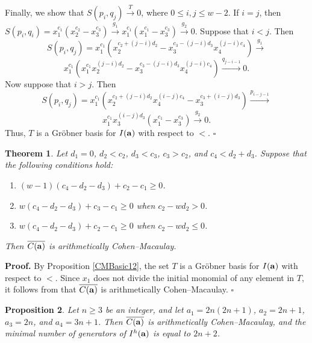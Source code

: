 \documentclass[10pt]{amsart}
\newtheorem{thm1}{Theorem}[section]
\newtheorem{prop1}[thm1]{Proposition}
\begin{document}
Finally, we show that $S(p_{i},q_{j}) \stackrel{T}{\longrightarrow} 0$, where $0 \leq i, j \leq w-2$. If $i=j$, then 
$S(p_i,q_i)=x_1^{c_1}(x_2^{c_2}-x_3^{c_3}) \stackrel{g_1} {\longrightarrow} x_1^{c_1}(x_1^{c_1}-x_3^{c_3}) \stackrel{g_2} {\longrightarrow} 0$. Suppose that $i<j$. Then $$S(p_{i},q_{j})=x_{1}^{c_1}(x_{2}^{c_2+(j-i)d_2}-x_{3}^{c_3-(j-i)d_3}x_{4}^{(j-i)c_4}) \stackrel{g_{1}}{\longrightarrow}$$ $$x_{1}^{c_1}(x_{1}^{c_1}x_{2}^{(j-i)d_2}-x_{3}^{c_3-(j-i)d_3}x_{4}^{(j-i)c_4}) \stackrel{q_{j-i-1}}{\longrightarrow} 0.$$ Now suppose that $i>j$. Then $$S(p_{i},q_{j})=x_{1}^{c_1}(x_{2}^{c_2+(j-i)d_2}x_{4}^{(i-j)c_4}-x_{3}^{c_3+(i-j)d_3}) \stackrel{p_{i-j-1}}{\longrightarrow}$$ $$x_{1}^{c_1}x_{3}^{(i-j)d_3}(x_{1}^{c_1}-x_{3}^{c_3}) \stackrel{g_{2}}{\longrightarrow} 0.$$ Thus, $T$ is a Gr\"obner basis for $I({\bf a})$ with respect to $<$. \hfill $\square$ \par\vspace{0.5\baselineskip}


\begin{thm1} \label{CM16} Let $d_1=0$, $d_{2}<c_{2}$, $d_{3}<c_{3}$, $c_3>c_2$, and $c_4<d_{2}+d_{3}$. Suppose that the following conditions hold:
\begin{enumerate} \item $(w-1)(c_{4}-d_{2}-d_{3})+c_{2}-c_{1} \geq 0$.
\item $w(c_{4}-d_{2}-d_{3})+c_{3}-c_{1} \geq 0$ when $c_{2}-wd_{2}> 0$.
\item $w(c_{4}-d_{2}-d_{3})+c_{2}-c_{1} \geq 0$ when $c_{2}-wd_{2} \leq 0$.

\end{enumerate}
Then $\overline{C({\bf a})}$ is arithmetically Cohen--Macaulay.
\end{thm1}

\noindent \textbf{Proof.} By Proposition \ref{CMBasic12}, the set $T$ is a Gr\"obner basis for $I({\bf a})$ with respect to $<$. Since $x_1$ does not divide the initial monomial of any element in $T$, it follows from \cite[Theorem 2.2]{HerSta} that $\overline{C({\bf a})}$ is arithmetically Cohen--Macaulay. \hfill $\square$


\begin{prop1} \label{ACM7} Let $n \geq 3$ be an integer, and let
$a_1=2n(2n+1)$, $a_2=2n+1$, $a_3=2n$, and $a_4=3n+1$. Then
$\overline{C({\bf a})}$ is arithmetically Cohen--Macaulay, and the minimal
number of generators of $I^{h}({\bf a})$ is equal to $2n+2$.
\end{prop1}
\end{document}
